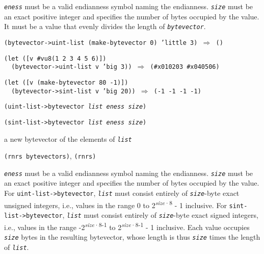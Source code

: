 \texttt{\textit{eness}} must be a valid endianness symbol naming the endianness.
\texttt{\textit{size}} must be an exact positive integer and specifies the number
of bytes occupied by the value.
It must be a value that evenly divides the length of \texttt{\textit{bytevector}}.

\begin{alltt}
(bytevector-\textgreater{}uint-list (make-bytevector 0) 'little 3) \(\Rightarrow\) ()

(let ([v \#{}vu8(1 2 3 4 5 6)])
  (bytevector-\textgreater{}uint-list v 'big 3)) \(\Rightarrow\) (\#{}x010203 \#{}x040506)

(let ([v (make-bytevector 80 -1)])
  (bytevector-\textgreater{}sint-list v 'big 20)) \(\Rightarrow\) (-1 -1 -1 -1)
\end{alltt}

\begin{description}

\label{objects_s261}\item[procedure] \texttt{(uint-list-\textgreater{}bytevector \textit{list} \textit{eness} \textit{size})}



\item[procedure] \texttt{(sint-list-\textgreater{}bytevector \textit{list} \textit{eness} \textit{size})}



\item[returns] a new bytevector of the elements of \texttt{\textit{list}}


\item[libraries] \texttt{(rnrs bytevectors)}, \texttt{(rnrs)}
\end{description}

\texttt{\textit{eness}} must be a valid endianness symbol naming the endianness.
\texttt{\textit{size}} must be an exact positive integer and specifies the number
of bytes occupied by the value.
For \texttt{uint-list-\textgreater{}bytevector}, \texttt{\textit{list}} must consist entirely of
\texttt{\textit{size}}-byte exact unsigned integers, i.e., values in the range
0 to 2\textsuperscript{\textit{size}·8} - 1 inclusive.
For \texttt{sint-list-\textgreater{}bytevector}, \texttt{\textit{list}} must consist entirely of
\texttt{\textit{size}}-byte exact signed integers, i.e., values in the range
-2\textsuperscript{\textit{size}·8-1} to 2\textsuperscript{\textit{size}·8-1} - 1 inclusive.
Each value occupies \texttt{\textit{size}} bytes in the resulting bytevector, whose
length is thus \texttt{\textit{size}} times the length of \texttt{\textit{list}}.

